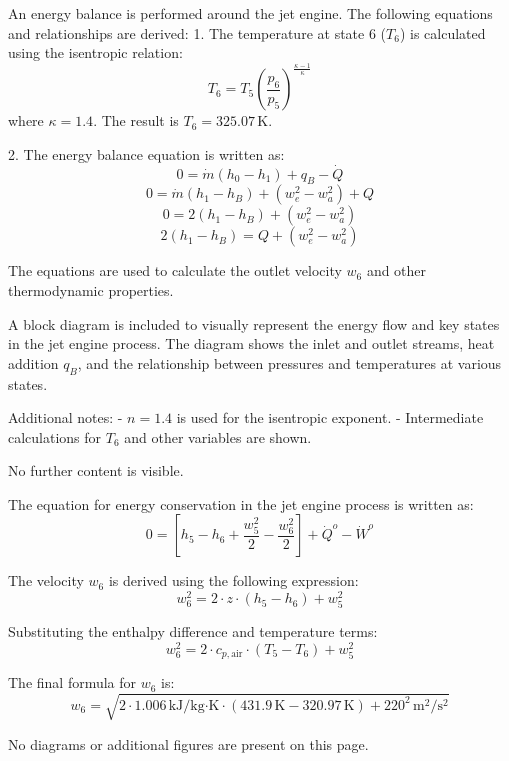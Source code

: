 An energy balance is performed around the jet engine.  
The following equations and relationships are derived:  
1. The temperature at state 6 (\( T_6 \)) is calculated using the isentropic relation:  
\[
T_6 = T_5 \left( \frac{p_6}{p_5} \right)^{\frac{\kappa - 1}{\kappa}}
\]  
where \( \kappa = 1.4 \).  
The result is \( T_6 = 325.07 \, \text{K} \).  

2. The energy balance equation is written as:  
\[
0 = \dot{m} \left( h_0 - h_1 \right) + q_B - \dot{Q}
\]  
\[
0 = \dot{m} \left( h_1 - h_B \right) + \left( w_e^2 - w_a^2 \right) + Q
\]  
\[
0 = 2 \left( h_1 - h_B \right) + \left( w_e^2 - w_a^2 \right)
\]  
\[
2 \left( h_1 - h_B \right) = Q + \left( w_e^2 - w_a^2 \right)
\]  

The equations are used to calculate the outlet velocity \( w_6 \) and other thermodynamic properties.  

A block diagram is included to visually represent the energy flow and key states in the jet engine process. The diagram shows the inlet and outlet streams, heat addition \( q_B \), and the relationship between pressures and temperatures at various states.  

Additional notes:  
- \( n = 1.4 \) is used for the isentropic exponent.  
- Intermediate calculations for \( T_6 \) and other variables are shown.  

No further content is visible.

The equation for energy conservation in the jet engine process is written as:  
\[
0 = \left[ h_5 - h_6 + \frac{w_5^2}{2} - \frac{w_6^2}{2} \right] + \dot{Q}^o - \dot{W}^o
\]  

The velocity \( w_6 \) is derived using the following expression:  
\[
w_6^2 = 2 \cdot z \cdot (h_5 - h_6) + w_5^2
\]  

Substituting the enthalpy difference and temperature terms:  
\[
w_6^2 = 2 \cdot c_{p,\text{air}} \cdot (T_5 - T_6) + w_5^2
\]  

The final formula for \( w_6 \) is:  
\[
w_6 = \sqrt{2 \cdot 1.006 \, \text{kJ/kg·K} \cdot (431.9 \, \text{K} - 320.97 \, \text{K}) + 220^2 \, \text{m}^2/\text{s}^2}
\]  

No diagrams or additional figures are present on this page.